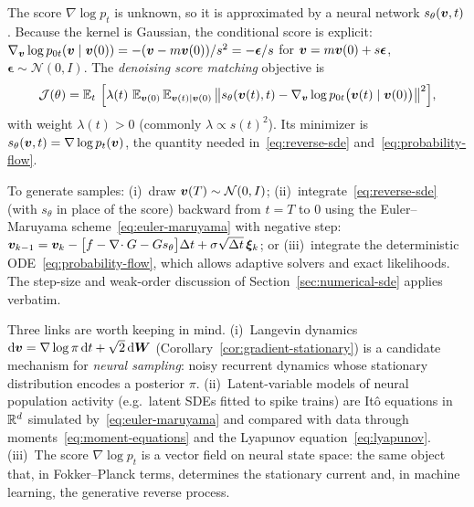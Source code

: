 The score $\nabla\log p_t$ is unknown, so it is approximated by a neural network $s_\theta(\bm{v},t)$. Because the kernel is Gaussian, the conditional score is explicit: $\nabla_{\bm{v}}\log p_{0t}(\bm{v}\mid\bm{v}(0))=-(\bm{v}-m\bm{v}(0))/s^2=-\boldsymbol\epsilon/s$ for $\bm{v}=m\bm{v}(0)+s\boldsymbol\epsilon$, $\boldsymbol\epsilon\sim\mathcal N(0,I)$. The \emph{denoising score matching} objective is
\begin{equation}
\label{eq:dsm}
\mathcal J(\theta)=\operatorname{\mathbb{E}}_{t}\,\Big[\lambda(t)\,\operatorname{\mathbb{E}}_{\bm{v}(0)}\operatorname{\mathbb{E}}_{\bm{v}(t)\mid\bm{v}(0)}\big\|s_\theta(\bm{v}(t),t)-\nabla_{\bm{v}}\log p_{0t}\big(\bm{v}(t)\mid\bm{v}(0)\big)\big\|^2\Big],
\end{equation}
with weight $\lambda(t)>0$ (commonly $\lambda\propto s(t)^2$). Its minimizer is $s_\theta(\bm{v},t)=\nabla\log p_t(\bm{v})$, the quantity needed in~\eqref{eq:reverse-sde} and~\eqref{eq:probability-flow}.

\begin{remark}
\label{rem:sampling}
To generate samples: (i)~draw $\bm{v}(T)\sim\mathcal N(0,I)$; (ii)~integrate~\eqref{eq:reverse-sde} (with $s_\theta$ in place of the score) backward from $t=T$ to $0$ using the Euler--Maruyama scheme~\eqref{eq:euler-maruyama} with negative step: $\bm{v}_{k-1}=\bm{v}_k-\big[f-\nabla\!\cdot G-Gs_\theta\big]\Delta t+\sigma\sqrt{\Delta t}\,\boldsymbol\xi_k$; or (iii)~integrate the deterministic ODE~\eqref{eq:probability-flow}, which allows adaptive solvers and exact likelihoods. The step-size and weak-order discussion of Section~\ref{sec:numerical-sde} applies verbatim.
\end{remark}

\begin{remark}
\label{rem:neuro-relevance}
Three links are worth keeping in mind. (i)~Langevin dynamics $\mathrm{d}\bm{v}=\nabla\log\pi\,\mathrm{d} t+\sqrt2\,\mathrm{d}\bm{W}$ (Corollary~\ref{cor:gradient-stationary}) is a candidate mechanism for \emph{neural sampling}: noisy recurrent dynamics whose stationary distribution encodes a posterior $\pi$. (ii)~Latent-variable models of neural population activity (e.g.\ latent SDEs fitted to spike trains) are It\^o equations in $\mathbb{R}^d$ simulated by~\eqref{eq:euler-maruyama} and compared with data through moments~\eqref{eq:moment-equations} and the Lyapunov equation~\eqref{eq:lyapunov}. (iii)~The score $\nabla\log p_t$ is a vector field on neural state space: the same object that, in Fokker--Planck terms, determines the stationary current and, in machine learning, the generative reverse process.
\end{remark}

